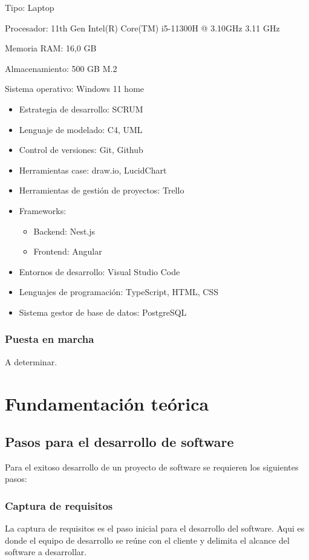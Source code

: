 \documentclass[a4paper, 12pt]{article}
\begin{document}
				Tipo: Laptop
				
				Procesador: 11th Gen Intel(R) Core(TM) i5-11300H @ 3.10GHz 3.11 GHz
				
				Memoria RAM: 16,0 GB
				
				Almacenamiento: 500 GB M.2
				
				Sistema operativo: Windows 11 home
				
				\begin{itemize}
					\item Estrategia de desarrollo: SCRUM
					\item Lenguaje de modelado: C4, UML
					\item Control de versiones: Git, Github
					\item Herramientas case: draw.io, LucidChart
					\item Herramientas de gestión de proyectos: Trello
					\item Frameworks:
						\begin{itemize}
							\item Backend: Nest.js
							\item Frontend: Angular
						\end{itemize}
					\item Entornos de desarrollo: Visual Studio Code
					\item Lenguajes de programación: TypeScript, HTML, CSS
					\item Sistema gestor de base de datos: PostgreSQL 
				\end{itemize}
				
			\subsubsection{Puesta en marcha}
				A determinar.
	\section{Fundamentación teórica}
		\subsection{Pasos para el desarrollo de software}
			Para el exitoso desarrollo de un proyecto de software se requieren los siguientes pasos:
			
			\subsubsection{Captura de requisitos}
				La captura de requisitos es el paso inicial para el desarrollo del software. Aqui es donde el equipo de desarrollo se reúne con el cliente y delimita el alcance del software a desarrollar.
\end{document}
